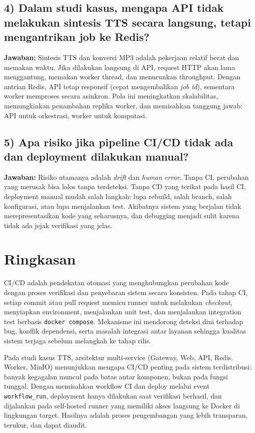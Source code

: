 \subsection*{4) Dalam studi kasus, mengapa API tidak melakukan sintesis TTS secara langsung, tetapi mengantrikan job ke Redis?}
\textbf{Jawaban:} Sintesis TTS dan konversi MP3 adalah pekerjaan relatif berat dan memakan waktu. Jika dilakukan langsung di API, request HTTP akan lama menggantung, memakan worker thread, dan menurunkan throughput. Dengan antrian Redis, API tetap responsif (cepat mengembalikan \textit{job id}), sementara worker memproses secara asinkron. Pola ini meningkatkan skalabilitas, memungkinkan penambahan replika worker, dan memisahkan tanggung jawab: API untuk orkestrasi, worker untuk komputasi.

\subsection*{5) Apa risiko jika pipeline CI/CD tidak ada dan deployment dilakukan manual?}
\textbf{Jawaban:} Risiko utamanya adalah \emph{drift} dan \emph{human error}. Tanpa CI, perubahan yang merusak bisa lolos tanpa terdeteksi. Tanpa CD yang terikat pada hasil CI, deployment manual mudah salah langkah: lupa rebuild, salah branch, salah konfigurasi, atau lupa menjalankan test. Akibatnya sistem yang berjalan tidak merepresentasikan kode yang seharusnya, dan debugging menjadi sulit karena tidak ada jejak verifikasi yang jelas.


\section{Ringkasan}

CI/CD adalah pendekatan otomasi yang menghubungkan perubahan kode dengan proses verifikasi dan penyebaran sistem secara konsisten. Pada tahap CI, setiap commit atau pull request memicu runner untuk melakukan \textit{checkout}, menyiapkan environment, menjalankan unit test, dan menjalankan integration test berbasis \texttt{docker compose}. Mekanisme ini mendorong deteksi dini terhadap bug, konflik dependensi, serta masalah integrasi antar layanan sehingga kualitas sistem terjaga sebelum melangkah ke tahap rilis.

Pada studi kasus TTS, arsitektur multi-service (Gateway, Web, API, Redis, Worker, MinIO) menunjukkan mengapa CI/CD penting pada sistem terdistribusi: banyak kegagalan muncul pada batas antar komponen, bukan pada fungsi tunggal. Dengan memisahkan workflow CI dan deploy melalui event \texttt{workflow\_run}, deployment hanya dilakukan saat verifikasi berhasil, dan dijalankan pada self-hosted runner yang memiliki akses langsung ke Docker di lingkungan target. Hasilnya adalah proses pengembangan yang lebih transparan, terukur, dan dapat diaudit.

